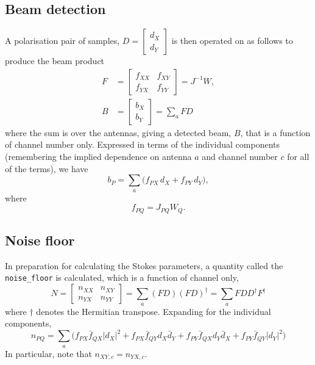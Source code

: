 \documentclass{article}
\begin{document}
\subsection{Beam detection}
A polarisation pair of samples, $D = \begin{bmatrix} d_X \\ d_Y \end{bmatrix}$ is then operated on as follows to produce the beam product
\begin{align}
    F &= \begin{bmatrix} f_{XX} & f_{XY} \\ f_{YX} & f_{YY} \end{bmatrix} = J^{-1} W, \\[5pt]
    B &= \begin{bmatrix} b_X \\ b_Y \end{bmatrix} = \sum_a FD
\end{align}
where the sum is over the antennas, giving a detected beam, $B$, that is a function of channel number only.
Expressed in terms of the individual components (remembering the implied dependence on antenna $a$ and channel number $c$ for all of the terms), we have
\begin{equation}
    b_P = \sum_a \bigg(f_{PX} \, d_X + f_{PY} \, d_Y\bigg),
\end{equation}
where
\begin{equation}
    f_{PQ} = J_{PQ} W_Q.
\end{equation}

\subsection{Noise floor}
In preparation for calculating the Stokes parameters, a quantity called the \texttt{noise\_floor} is calculated, which is a function of channel only,
\begin{equation}
    N = \begin{bmatrix} n_{XX} & n_{XY} \\ n_{YX} & n_{YY} \end{bmatrix}
      = \sum_a (FD)(FD)^\dagger
      = \sum_a FDD^\dagger F^\dagger
\end{equation}
where $\dagger$ denotes the Hermitian transpose. Expanding for the individual components,
\begin{equation}
    n_{PQ} = \sum_a \bigg(f_{PX} \bar{f}_{QX} |d_X|^2       + f_{PX} \bar{f}_{QY} d_X \bar{d}_Y +
                          f_{PY} \bar{f}_{QX} d_Y \bar{d}_X + f_{PY} \bar{f}_{QY} |d_Y|^2
                    \bigg)
    \label{eqn:ncomponents}
\end{equation}
In particular, note that $n_{XY,c} = n_{YX,c}$.
\end{document}
